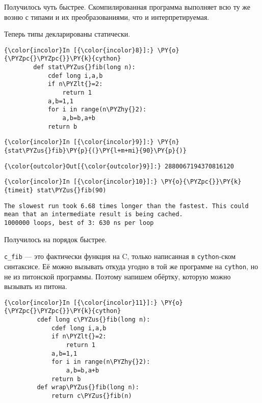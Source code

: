     Получилось чуть быстрее. Скомпилированная программа выполняет всю ту же
возню с типами и их преобразованиями, что и интерпретируемая.

Теперь типы декларированы статически.

    \begin{Verbatim}[commandchars=\\\{\}]
{\color{incolor}In [{\color{incolor}8}]:} \PY{o}{\PYZpc{}\PYZpc{}}\PY{k}{cython}
        def stat\PYZus{}fib(long n):
            cdef long i,a,b
            if n\PYZlt{}=2:
                return 1
            a,b=1,1
            for i in range(n\PYZhy{}2):
                a,b=b,a+b
            return b
\end{Verbatim}

    \begin{Verbatim}[commandchars=\\\{\}]
{\color{incolor}In [{\color{incolor}9}]:} \PY{n}{stat\PYZus{}fib}\PY{p}{(}\PY{l+m+mi}{90}\PY{p}{)}
\end{Verbatim}

            \begin{Verbatim}[commandchars=\\\{\}]
{\color{outcolor}Out[{\color{outcolor}9}]:} 2880067194370816120
\end{Verbatim}
        
    \begin{Verbatim}[commandchars=\\\{\}]
{\color{incolor}In [{\color{incolor}10}]:} \PY{o}{\PYZpc{}}\PY{k}{timeit} stat\PYZus{}fib(90)
\end{Verbatim}

    \begin{Verbatim}[commandchars=\\\{\}]
The slowest run took 6.68 times longer than the fastest. This could mean that an intermediate result is being cached.
1000000 loops, best of 3: 630 ns per loop

    \end{Verbatim}

    Получилось на порядок быстрее.

\texttt{c\_fib} --- это фактически функция на C, только написанная в
\texttt{cython}-ском синтаксисе. Её можно вызывать откуда угодно в той
же программе на \texttt{cython}, но не из питонской программы. Поэтому
напишем обёртку, которую можно вызывать из питона.

    \begin{Verbatim}[commandchars=\\\{\}]
{\color{incolor}In [{\color{incolor}11}]:} \PY{o}{\PYZpc{}\PYZpc{}}\PY{k}{cython}
         cdef long c\PYZus{}fib(long n):
             cdef long i,a,b
             if n\PYZlt{}=2:
                 return 1
             a,b=1,1
             for i in range(n\PYZhy{}2):
                 a,b=b,a+b
             return b
         def wrap\PYZus{}fib(long n):
             return c\PYZus{}fib(n)
\end{Verbatim}

